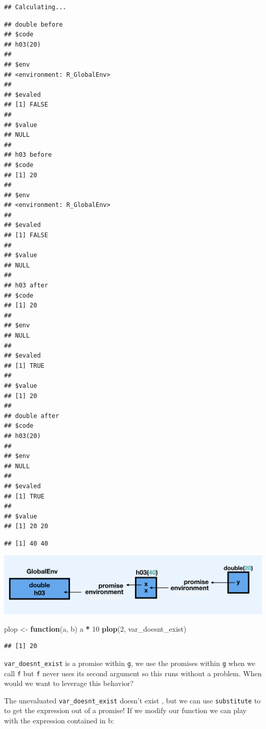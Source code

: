 \documentclass[]{book}
\newenvironment{Shaded}{\begin{snugshade}}{\end{snugshade}}
\newcommand{\ControlFlowTok}[1]{\textcolor[rgb]{0.13,0.29,0.53}{\textbf{#1}}}
\newcommand{\DecValTok}[1]{\textcolor[rgb]{0.00,0.00,0.81}{#1}}
\newcommand{\KeywordTok}[1]{\textcolor[rgb]{0.13,0.29,0.53}{\textbf{#1}}}
\newcommand{\NormalTok}[1]{#1}
\newcommand{\OperatorTok}[1]{\textcolor[rgb]{0.81,0.36,0.00}{\textbf{#1}}}
\newcommand{\StringTok}[1]{\textcolor[rgb]{0.31,0.60,0.02}{#1}}
\begin{document}
\begin{verbatim}
## Calculating...
\end{verbatim}

\begin{verbatim}
## double before
## $code
## h03(20)
## 
## $env
## <environment: R_GlobalEnv>
## 
## $evaled
## [1] FALSE
## 
## $value
## NULL
## 
## h03 before
## $code
## [1] 20
## 
## $env
## <environment: R_GlobalEnv>
## 
## $evaled
## [1] FALSE
## 
## $value
## NULL
## 
## h03 after
## $code
## [1] 20
## 
## $env
## NULL
## 
## $evaled
## [1] TRUE
## 
## $value
## [1] 20
## 
## double after
## $code
## h03(20)
## 
## $env
## NULL
## 
## $evaled
## [1] TRUE
## 
## $value
## [1] 20 20
\end{verbatim}

\begin{verbatim}
## [1] 40 40
\end{verbatim}

\begin{center}\includegraphics[width=20.22in]{images/promise} \end{center}

\begin{Shaded}
\begin{Highlighting}[]
\NormalTok{plop <-}\StringTok{ }\ControlFlowTok{function}\NormalTok{(a, b) a }\OperatorTok{*}\StringTok{ }\DecValTok{10}
\KeywordTok{plop}\NormalTok{(}\DecValTok{2}\NormalTok{, var_doesnt_exist)}
\end{Highlighting}
\end{Shaded}

\begin{verbatim}
## [1] 20
\end{verbatim}

\texttt{var\_doesnt\_exist} is a promise within \texttt{g}, we use the promises within \texttt{g} when we call \texttt{f} but \texttt{f} never uses its second argument so this runs without a problem. When would we want to leverage this behavior?

The unevaluated \texttt{var\_doesnt\_exist} doesn't exist , but we can use \texttt{substitute} to to get the expression out of a promise! If we modify our function we can play with the expression contained in b:
\end{document}
